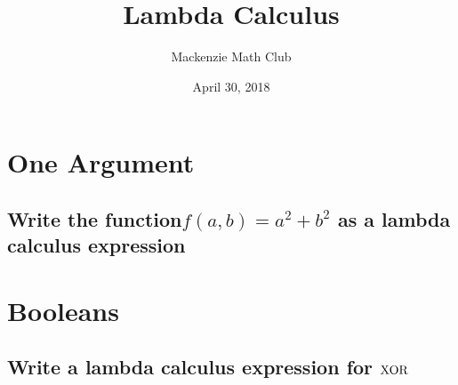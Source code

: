 


\title{Lambda Calculus}
\author{Mackenzie Math Club}
\date{April 30, 2018}



	\section*{One Argument}
		\subsection{Write the function$f(a, b) = a^2 + b^2$ as a lambda calculus expression}
		\solutionspace{1in}
	\section*{Booleans}
		\subsection{Write a lambda calculus expression for $\mathrm{XOR}$}
		\solutionspace{1in}

